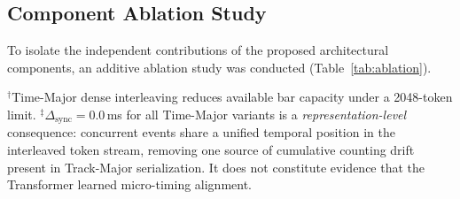 \documentclass[pdflatex,sn-mathphys-num,twocolumn]{sn-jnl}
\theoremstyle{thmstyleone}
\theoremstyle{thmstyletwo}
\begin{document}
\subsection{Component Ablation Study}
\label{sec:ablation}
To isolate the independent contributions of the proposed architectural components, an additive ablation study was conducted (Table~\ref{tab:ablation}).

\begin{tableorg}[ht]
\centering\small
\caption{Component Ablation Study. Sequential addition of core modules from baseline to full PulseFormer. Metrics for rows 1--4 evaluate \emph{local model capability} on 8-bar loops (validation set). The final row (Sectional Stitching) evaluates \emph{hybrid-controller target adherence} over 128-bar arrangements, where structural adherence (PR) reflects both FiLM-conditioned generation and the deterministic Ramp Scheduler. $\Delta_{\mathrm{sync}}$: cross-track onset deviation (ms); GC\%: groove consistency; PR: Pearson $r$ vs.\ target density ramp; ISR\%: in-scale note rate.}
\label{tab:ablation}
\vspace{2pt}
{\scriptsize $^{\dagger}$Time-Major dense interleaving reduces available bar capacity under a 2048-token limit.\newline
$^{\ddagger}$$\Delta_{\mathrm{sync}}=0.0$\,ms for all Time-Major variants is a \emph{representation-level} consequence: concurrent events share a unified temporal position in the interleaved token stream, removing one source of cumulative counting drift present in Track-Major serialization. It does not constitute evidence that the Transformer learned micro-timing alignment.}
\end{tableorg}
\end{document}
